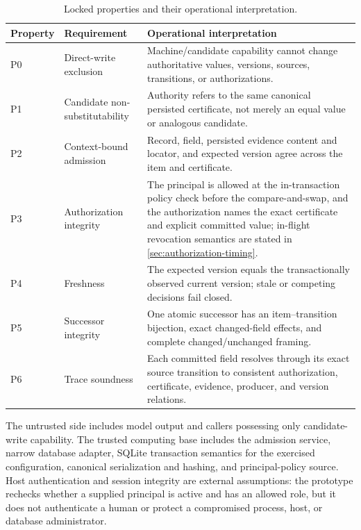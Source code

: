 \begin{table}[t]
\centering
\caption{Locked properties and their operational interpretation.}
\label{tab:properties}
\begin{tabularx}{\textwidth}{@{}l>{\raggedright\arraybackslash}p{}>{\raggedright\arraybackslash}X@{}}
\toprule
Property & Requirement & Operational interpretation \\
\midrule
P0 & Direct-write exclusion & Machine/candidate capability cannot change authoritative values, versions, sources, transitions, or authorizations. \\
P1 & Candidate non-substitutability & Authority refers to the same canonical persisted certificate, not merely an equal value or analogous candidate. \\
P2 & Context-bound admission & Record, field, persisted evidence content and locator, and expected version agree across the item and certificate. \\
P3 & Authorization integrity & The principal is allowed at the in-transaction policy check before the compare-and-swap, and the authorization names the exact certificate and explicit committed value; in-flight revocation semantics are stated in \cref{sec:authorization-timing}. \\
P4 & Freshness & The expected version equals the transactionally observed current version; stale or competing decisions fail closed. \\
P5 & Successor integrity & One atomic successor has an item--transition bijection, exact changed-field effects, and complete changed/unchanged framing. \\
P6 & Trace soundness & Each committed field resolves through its exact source transition to consistent authorization, certificate, evidence, producer, and version relations. \\
\bottomrule
\end{tabularx}
\end{table}

The untrusted side includes model output and callers possessing only candidate-write capability. The trusted computing base includes the admission service, narrow database adapter, SQLite transaction semantics for the exercised configuration, canonical serialization and hashing, and principal-policy source. Host authentication and session integrity are external assumptions: the prototype rechecks whether a supplied principal is active and has an allowed role, but it does not authenticate a human or protect a compromised process, host, or database administrator.

